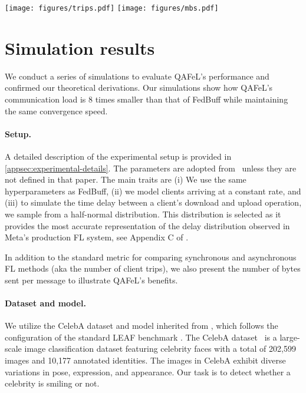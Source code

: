 \documentclass[nohyperref]{article}
\theoremstyle{plain}
\theoremstyle{definition}
\theoremstyle{remark}
\newcommand{\algname}{{QAFeL}\xspace} %
\DeclareMathOperator{\qsgd}{qsgd}
\begin{document}
\begin{figure*}
    \centering
    \hfill
    \texttt{[image: figures/trips.pdf]}
    \hfill
    \texttt{[image: figures/mbs.pdf]}
    \hfill
    \caption{\algname and FedBuff's communication metrics to reach a validation accuracy (90\%) for different concurrency values (clients training in parallel). \algname is using 4-bit $\qsgd$ quantization at both server and client, therefore the MB broadcasted are simply the MB uploaded divided by the buffer size, which is 10.
    }
    \label{fig:Fig3FedBuff}
\end{figure*}
\section{Simulation results}
\label{sec:experiments}

We conduct a series of simulations to evaluate \algname's performance and confirmed our theoretical derivations.
Our simulations show how \algname's communication load is $8$ times smaller than that of FedBuff while maintaining the same convergence speed.

\paragraph{Setup.}
A detailed description of the experimental setup is provided in \cref{appsec:experimental-details}.
The parameters are adopted from~\cite{FedBuff} unless they are not defined in that paper.
The main traits are (i) We use the same hyperparameters as FedBuff, (ii) we model clients arriving at a constant rate, and (iii) to simulate the time delay between a client's download and upload operation, we sample from a half-normal distribution.
This distribution is selected as it provides the most accurate representation of the delay distribution observed in Meta's production FL system, see Appendix C of \cite{FedBuff}.

In addition to the standard metric for comparing synchronous and asynchronous FL methods (aka the number of client trips), we also present the number of bytes sent per message to illustrate \algname's benefits.

\paragraph{Dataset and model.}
We utilize the CelebA dataset and model inherited from \cite{FedBuff}, which follows the configuration of the standard LEAF benchmark \cite{LEAF}.
The CelebA dataset~\cite{celeba} is a large-scale image classification dataset featuring celebrity faces with a total of 202,599 images and 10,177 annotated identities.
The images in CelebA exhibit diverse variations in pose, expression, and appearance.
Our task is to detect whether a celebrity is smiling or not.
\end{document}
